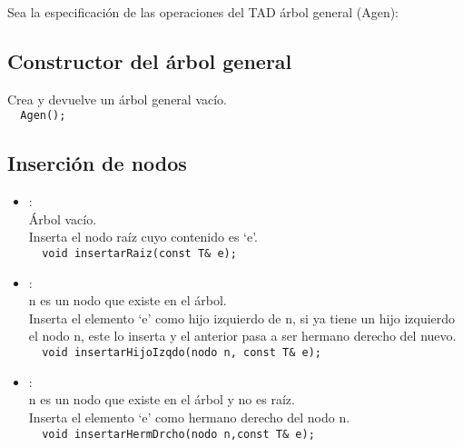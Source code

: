 Sea la especificación de las operaciones del TAD árbol general (Agen):

\subsection*{Constructor del árbol general}
 Crea y devuelve un árbol general vacío.\\
\verb|  Agen();|

\subsection*{Inserción de nodos}
\begin{itemize}
  \item {}:\\
   Árbol vacío.\\
   Inserta el nodo raíz cuyo contenido es `e'.\\
  \verb|  void insertarRaiz(const T& e);|

  \item {}:\\
   n es un nodo que existe en el árbol.\\
   Inserta el elemento `e' como hijo izquierdo de n, si ya tiene un hijo izquierdo el nodo n, este lo inserta y el anterior pasa a ser hermano derecho del nuevo.\\
  \verb|  void insertarHijoIzqdo(nodo n, const T& e);|

  \item {}:\\
   n es un nodo que existe en el árbol y no es raíz.\\
   Inserta el elemento `e' como hermano derecho del nodo n.\\
  \verb|  void insertarHermDrcho(nodo n,const T& e);|
\end{itemize}
